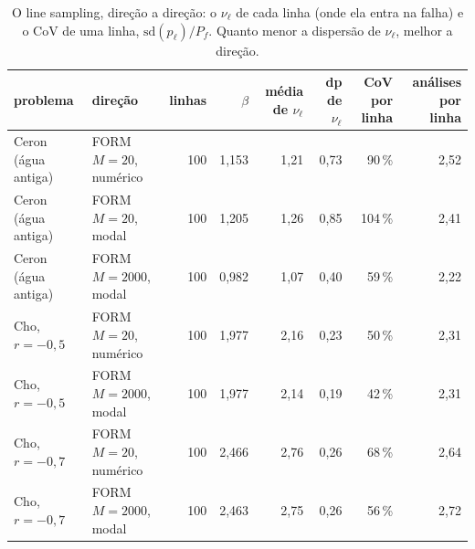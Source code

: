 \begin{landscape}
\begin{table}[H]\centering\small
\caption{O line sampling, direção a direção: o $\nu_\ell$ de cada linha (onde ela entra na falha) e o CoV de uma linha, $\mathrm{sd}(p_\ell)/P_f$. Quanto menor a dispersão de $\nu_\ell$, melhor a direção.}\label{tab:ls}
\begin{tabular}{llrrrrrr}\toprule
problema & direção & linhas & $\beta$ & média de $\nu_\ell$ & dp de $\nu_\ell$ & CoV por linha & análises por linha \\\midrule
Ceron (água antiga) & FORM $M = 20$, numérico & 100 & 1,153 & 1,21 & 0,73 & 90\,\% & 2,52 \\
Ceron (água antiga) & FORM $M = 20$, modal & 100 & 1,205 & 1,26 & 0,85 & 104\,\% & 2,41 \\
Ceron (água antiga) & FORM $M = 2000$, modal & 100 & 0,982 & 1,07 & 0,40 & 59\,\% & 2,22 \\
Cho, $r = -0{,}5$ & FORM $M = 20$, numérico & 100 & 1,977 & 2,16 & 0,23 & 50\,\% & 2,31 \\
Cho, $r = -0{,}5$ & FORM $M = 2000$, modal & 100 & 1,977 & 2,14 & 0,19 & 42\,\% & 2,31 \\
Cho, $r = -0{,}7$ & FORM $M = 20$, numérico & 100 & 2,466 & 2,76 & 0,26 & 68\,\% & 2,64 \\
Cho, $r = -0{,}7$ & FORM $M = 2000$, modal & 100 & 2,463 & 2,75 & 0,26 & 56\,\% & 2,72 \\
\bottomrule\end{tabular}\end{table}


\end{landscape}
